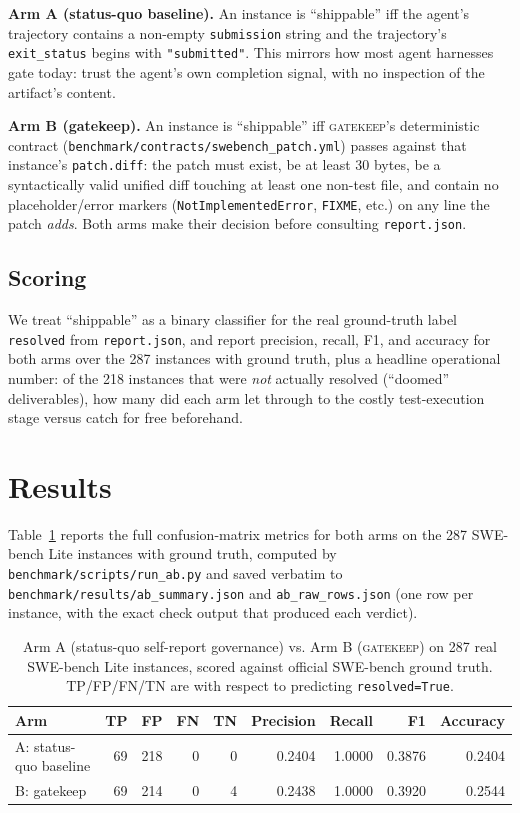\documentclass{article}
\begin{document}
\textbf{Arm A (status-quo baseline).} An instance is ``shippable'' iff the
agent's trajectory contains a non-empty \texttt{submission} string and the
trajectory's \texttt{exit\_status} begins with \texttt{"submitted"}. This
mirrors how most agent harnesses gate today: trust the agent's own
completion signal, with no inspection of the artifact's content.

\textbf{Arm B (gatekeep).} An instance is ``shippable'' iff
\textsc{gatekeep}'s deterministic contract
(\texttt{benchmark/contracts/swebench\_patch.yml}) passes against that
instance's \texttt{patch.diff}: the patch must exist, be at least 30
bytes, be a syntactically valid unified diff touching at least one
non-test file, and contain no placeholder/error markers
(\texttt{NotImplementedError}, \texttt{FIXME}, etc.) on any line the patch
\emph{adds}. Both arms make their decision before consulting
\texttt{report.json}.

\subsection{Scoring}

We treat ``shippable'' as a binary classifier for the real ground-truth
label \texttt{resolved} from \texttt{report.json}, and report precision,
recall, F1, and accuracy for both arms over the 287 instances with ground
truth, plus a headline operational number: of the 218 instances that were
\emph{not} actually resolved (``doomed'' deliverables), how many did each
arm let through to the costly test-execution stage versus catch for free
beforehand.

\section{Results}
\label{sec:results}

Table~\ref{tab:ab} reports the full confusion-matrix metrics for both arms
on the 287 SWE-bench Lite instances with ground truth, computed by
\texttt{benchmark/scripts/run\_ab.py} and saved verbatim to
\texttt{benchmark/results/ab\_summary.json} and
\texttt{ab\_raw\_rows.json} (one row per instance, with the exact check
output that produced each verdict).

\begin{table}[t]
  \caption{Arm A (status-quo self-report governance) vs. Arm B
  (\textsc{gatekeep}) on 287 real SWE-bench Lite instances, scored against
  official SWE-bench ground truth. TP/FP/FN/TN are with respect to
  predicting \texttt{resolved=True}.}
  \label{tab:ab}
  \centering
  \begin{tabular}{lrrrrrrrr}
    \toprule
    Arm & TP & FP & FN & TN & Precision & Recall & F1 & Accuracy \\
    \midrule
    A: status-quo baseline & 69 & 218 & 0 & 0 & 0.2404 & 1.0000 & 0.3876 & 0.2404 \\
    B: gatekeep            & 69 & 214 & 0 & 4 & 0.2438 & 1.0000 & 0.3920 & 0.2544 \\
    \bottomrule
  \end{tabular}
\end{table}
\end{document}
